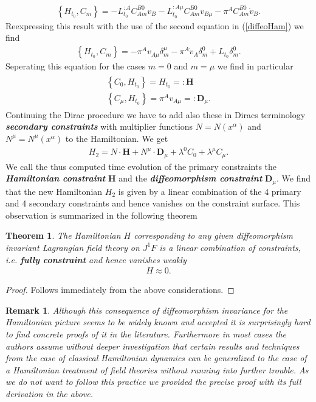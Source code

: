 \documentclass[a4paper,12pt, DIV=14, BCOR=5mm, twoside, headsepline]{scrbook}
\newtheorem{theorem}{Theorem}[section]
\newtheorem*{remark}{Remark}
\begin{document}
\begin{align}
    \left \{H_{t_0}, C_m \right \} = -L_{t_0}^{:A} C_{Am}^{B0} v_B - L_{t_0}^{:A\mu} C_{Am}^{B0}v_{B \mu} - \pi^A C_{Am}^{B0} \dot{v}_B.
\end{align}
Reexpressing this result with the use of the second equation in (\ref{diffeoHam}) we find 
\begin{align}
    \left \{H_{t_0}, C_m \right \} = -\pi^A v_{A\mu} \delta^{\mu}_m - \pi^A \dot{v}_A \delta^0_m + L_{t_0}\delta^0_m.
\end{align}
Seperating this equation for the cases $m=0$ and $m = \mu$ we find in particular
\begin{align}
\begin{aligned}
    \left \{C_0 , H_{t_0}\right \} = H_{t_0} =: \mathbf{H} \\
    \left \{C_{\mu} , H_{t_0}\right \} = \pi^A v_{A\mu} =: \mathbf{D}_{\mu}.
\end{aligned}
\end{align}
Continuing the Dirac procedure we have to add also these in Diracs terminology \textit{\textbf{secondary constraints}} with multiplier functions $N=N(x^{\alpha})$ and $N^{\mu}= N^{\mu}(x^{\alpha})$ to the Hamiltonian. We get
\begin{align}
H_{2} = N \cdot \mathbf{H} + N^{\mu} \cdot \mathbf{D}_{\mu} + \lambda^0 C_0 + \lambda^{\mu}C_{\mu}.
\end{align}
We call the thus computed time evolution of the primary constraints the \textit{\textbf{Hamiltonian constraint}} $\mathbf{H}$ and the \textit{\textbf{diffeomorphism constraint}} $\mathbf{D}_{\mu}$.
We find that the new Hamiltonian $H_{2}$ is given by a linear combination of the 4 primary and 4 secondary constraints and hence vanishes on the constraint surface. This observation is summarized in the following theorem
\begin{theorem}
The Hamiltonian $H$ corresponding to any given diffeomorphism invariant Lagrangian field theory on $J^1F$ is a linear combination of constraints, i.e. \textbf{\textit{fully constraint}} and hence vanishes weakly
\begin{align}
   H \approx 0.
\end{align}
\end{theorem}
\begin{proof}
Follows immediately from the above considerations.
\end{proof}
\begin{remark}
Although this consequence of diffeomorphism invariance for the Hamiltonian picture seems to be widely known and accepted it is surprisingly hard to find concrete proofs of it in the literature. Furthermore in most cases the authors assume without deeper investigation that certain results and techniques from the case of classical Hamiltonian dynamics can be generalized to the case of a Hamiltonian treatment of field theories without running into further trouble. As we do not want to follow this practice we provided the precise proof with its full derivation in the above.
\end{remark}
\end{document}
